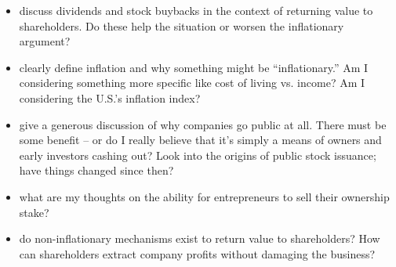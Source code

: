 \note{[Todo]:}
\begin{itemize}
    \item {} discuss dividends and stock buybacks in the context of returning value to shareholders.  Do these help the situation or worsen the inflationary argument?
    \item \note{[Inflation]:} clearly define inflation and why something might be ``inflationary.''  Am I considering something more specific like cost of living vs. income?  Am I considering the U.S.'s inflation index?
    \item \note{[IPOs]:} give a generous discussion of why companies go public at all.  There must be some benefit -- or do I really believe that it's simply a means of owners and early investors cashing out?  Look into the origins of public stock issuance; have things changed since then?
    \item {} what are my thoughts on the ability for entrepreneurs to sell their ownership stake?
    \item {} do non-inflationary mechanisms exist to return value to shareholders?  How can shareholders extract company profits without damaging the business?  
\end{itemize}